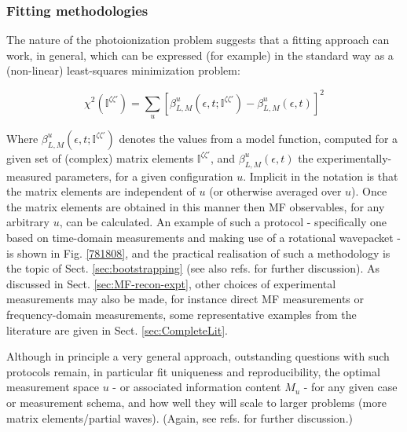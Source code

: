 \subsubsection{Fitting methodologies\label{sec:fitting-intro}}

The nature of the photoionization problem suggests that a fitting approach can work, in general, which can be expressed (for example) in the standard way as a (non-linear) least-squares minimization problem:

\begin{equation}
\chi^{2}(\mathbb{I}^{\zeta\zeta'})=\sum_{u}\left[\beta^{u}_{L,M}(\epsilon,t;\mathbb{I}^{\zeta\zeta'})-\beta^{u}_{L,M}(\epsilon,t)\right]^{2}\label{eq:chi2-I}
\end{equation}

Where $\beta^{u}_{L,M}(\epsilon,t;\mathbb{I}^{\zeta\zeta'})$ denotes  the values from a model function, computed for a given set of (complex) matrix elements $\mathbb{I}^{\zeta\zeta'}$, and $\beta^{u}_{L,M}(\epsilon,t)$ the experimentally-measured parameters, for a given configuration $u$. Implicit in the notation is that the matrix elements are independent of $u$ (or otherwise averaged over $u$). Once the matrix elements are obtained in this manner then MF observables, for any arbitrary $u$, can be calculated. An example of such a protocol - specifically one based on time-domain measurements and making use of a rotational wavepacket - is shown in Fig. \ref{781808}, %
and the practical realisation of such a methodology is the topic of Sect. \ref{sec:bootstrapping} (see also refs. \cite{hockett2018QMP2, marceau2017MolecularFrameReconstruction} for further discussion). As discussed in Sect. \ref{sec:MF-recon-expt}, other choices of experimental measurements may also be made, for instance direct MF measurements or frequency-domain measurements, some representative examples from the literature are given in Sect. \ref{sec:CompleteLit}. 

Although in principle a very general approach, outstanding questions with such protocols remain, in particular fit uniqueness and reproducibility, the optimal measurement space $u$ - or associated information content $M_u$ - for any given case or measurement schema, and how well they will scale to larger problems (more matrix elements/partial waves). (Again, see refs. \cite{hockett2018QMP2, marceau2017MolecularFrameReconstruction} for further discussion.)


